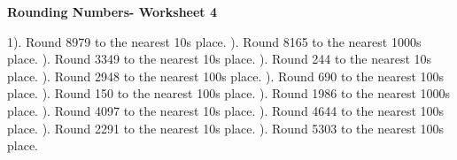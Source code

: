 \documentclass{article}%
\begin{document}
\pagebreak%
\large%
\begin{center}%
\textbf{Rounding Numbers- Worksheet 4}%
\newline%
\newline%
\newline%
\end{center} \normalsize%
1). Round 8979 to the nearest 10s place.%
\newline%
\newline%
). Round 8165 to the nearest 1000s place.%
\newline%
\newline%
). Round 3349 to the nearest 10s place.%
\newline%
\newline%
). Round 244 to the nearest 10s place.%
\newline%
\newline%
). Round 2948 to the nearest 100s place.%
\newline%
\newline%
). Round 690 to the nearest 100s place.%
\newline%
\newline%
). Round 150 to the nearest 100s place.%
\newline%
\newline%
). Round 1986 to the nearest 1000s place.%
\newline%
\newline%
). Round 4097 to the nearest 10s place.%
\newline%
\newline%
). Round 4644 to the nearest 100s place.%
\newline%
\newline%
). Round 2291 to the nearest 10s place.%
\newline%
\newline%
). Round 5303 to the nearest 100s place.%
\newline%
\newline%
\newline%
\end{document}
